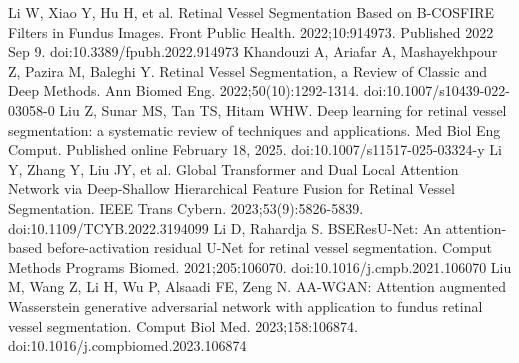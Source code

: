 \documentclass[12pt,letterpaper]{article}
\begin{document}
\begin{thebibliography}{9}
     Li W, Xiao Y, Hu H, et al. Retinal Vessel Segmentation Based on B-COSFIRE Filters in Fundus Images. Front Public Health. 2022;10:914973. Published 2022 Sep 9. doi:10.3389/fpubh.2022.914973
     Khandouzi A, Ariafar A, Mashayekhpour Z, Pazira M, Baleghi Y. Retinal Vessel Segmentation, a Review of Classic and Deep Methods. Ann Biomed Eng. 2022;50(10):1292-1314. doi:10.1007/s10439-022-03058-0
     Liu Z, Sunar MS, Tan TS, Hitam WHW. Deep learning for retinal vessel segmentation: a systematic review of techniques and applications. Med Biol Eng Comput. Published online February 18, 2025. doi:10.1007/s11517-025-03324-y
     Li Y, Zhang Y, Liu JY, et al. Global Transformer and Dual Local Attention Network via Deep-Shallow Hierarchical Feature Fusion for Retinal Vessel Segmentation. IEEE Trans Cybern. 2023;53(9):5826-5839. doi:10.1109/TCYB.2022.3194099
     Li D, Rahardja S. BSEResU-Net: An attention-based before-activation residual U-Net for retinal vessel segmentation. Comput Methods Programs Biomed. 2021;205:106070. doi:10.1016/j.cmpb.2021.106070
     Liu M, Wang Z, Li H, Wu P, Alsaadi FE, Zeng N. AA-WGAN: Attention augmented Wasserstein generative adversarial network with application to fundus retinal vessel segmentation. Comput Biol Med. 2023;158:106874. doi:10.1016/j.compbiomed.2023.106874
\end{thebibliography}
    
\end{document}
